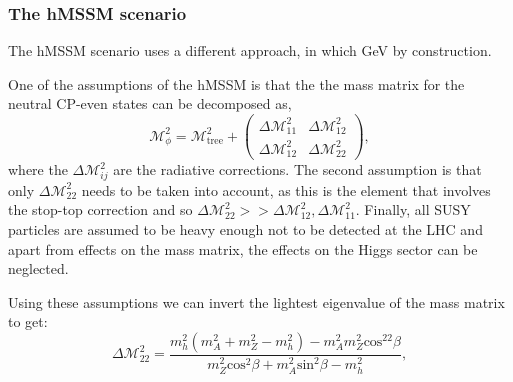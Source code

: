 \subsubsection{The hMSSM scenario}
\label{sec:theory_BSM_models_hMSSM}
The hMSSM scenario \cite{hMSSM-1,hMSSM-2} uses a different approach, in
which  GeV by construction. 

One of the assumptions of the hMSSM is that the
the mass matrix for the neutral CP-even states can
be decomposed as,
\begin{equation}
\label{eqn:hmssm_massmatrix}
\mathcal{M}^2_{\phi} = \mathcal{M}^2_{\text{tree}} + \begin{pmatrix}
\Delta\mathcal{M}^2_{11} & \Delta\mathcal{M}^2_{12} \\
\Delta\mathcal{M}^2_{12} & \Delta\mathcal{M}^2_{22} \end{pmatrix},
\end{equation}
where the $\Delta\mathcal{M}^2_{ij}$ are the radiative corrections.
The second assumption is that only $\Delta\mathcal{M}^2_{22}$ needs to be
taken into account, as this is the element that involves the stop-top correction
and so $\Delta\mathcal{M}^2_{22} >> \Delta\mathcal{M}^2_{12},\Delta\mathcal{M}^2_{11}$. 
Finally, all SUSY particles are assumed to be heavy enough not to be
detected at the \acs{LHC} and apart from effects on the mass matrix, 
the effects on the Higgs sector can be neglected.

Using these assumptions we can invert the lightest eigenvalue
of the mass matrix to get: 
\begin{equation}
\label{eqn:hmssm_deltam22}
\Delta\mathcal{M}^2_{22} = \frac{m_h^2(m_A^2+m_Z^2 - m_h^2) - m_A^2m_Z^2\text{cos}^22\beta}{m_Z^2\text{cos}^2\beta + m_A^2\text{sin}^2\beta - m_h^2},
\end{equation}

